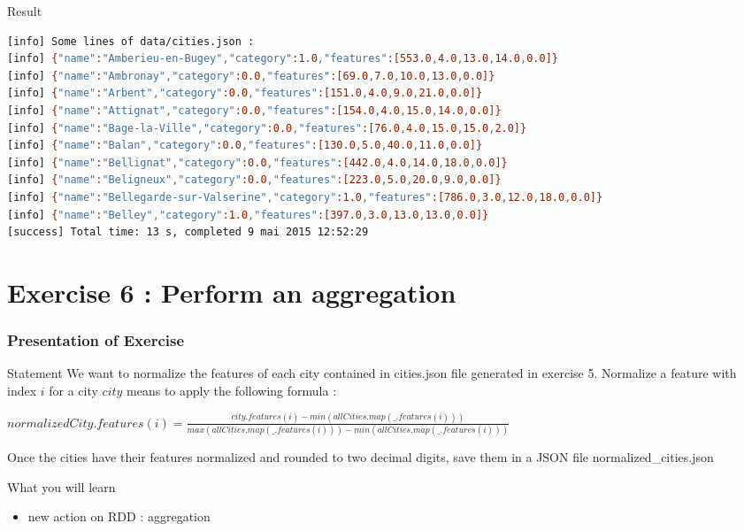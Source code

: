\documentclass[slidetop,9pt,utf8]{beamer}
\begin{document}
\begin{CJK}{UTF8}{gbsn}
\begin{frame}[fragile]
  \begin{block}{Result}
    \begin{lstlisting}[language=bash, style=terminal]
[info] Some lines of data/cities.json : 
[info] {"name":"Amberieu-en-Bugey","category":1.0,"features":[553.0,4.0,13.0,14.0,0.0]}
[info] {"name":"Ambronay","category":0.0,"features":[69.0,7.0,10.0,13.0,0.0]}
[info] {"name":"Arbent","category":0.0,"features":[151.0,4.0,9.0,21.0,0.0]}
[info] {"name":"Attignat","category":0.0,"features":[154.0,4.0,15.0,14.0,0.0]}
[info] {"name":"Bage-la-Ville","category":0.0,"features":[76.0,4.0,15.0,15.0,2.0]}
[info] {"name":"Balan","category":0.0,"features":[130.0,5.0,40.0,11.0,0.0]}
[info] {"name":"Bellignat","category":0.0,"features":[442.0,4.0,14.0,18.0,0.0]}
[info] {"name":"Beligneux","category":0.0,"features":[223.0,5.0,20.0,9.0,0.0]}
[info] {"name":"Bellegarde-sur-Valserine","category":1.0,"features":[786.0,3.0,12.0,18.0,0.0]}
[info] {"name":"Belley","category":1.0,"features":[397.0,3.0,13.0,13.0,0.0]}
[success] Total time: 13 s, completed 9 mai 2015 12:52:29
    \end{lstlisting}
  \end{block}

\end{frame}


\section{Exercise 6 : Perform an aggregation}

\begin{frame}
  \frametitle{Presentation of Exercise}

  \begin{block}{Statement}
    We want to normalize the features of each city contained in cities.json file generated in exercise 5. Normalize a feature with index $i$ for a city $city$ means to apply the following formula :
\begin{center} 
    $normalizedCity.features(i) = \frac{city.features(i) - min(allCities.map(\_.features(i)))}{max(allCities.map(\_.features(i))) - min(allCities.map(\_.features(i)))}$
\end{center}
Once the cities have their features normalized and rounded to two decimal digits, save them in a JSON file normalized\_cities.json
  \end{block}

  \begin{block}{What you will learn}
    \begin{itemize}
      \item new action on RDD : aggregation
    \end{itemize}
  \end{block}


\end{frame}
\end{CJK}
\end{document}
